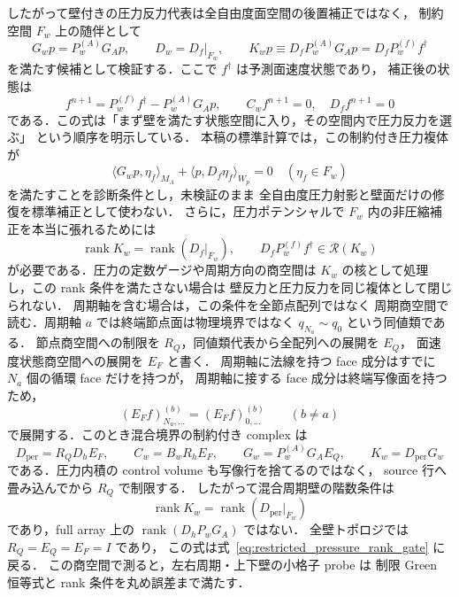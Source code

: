 したがって壁付きの圧力反力代表は全自由度面空間の後置補正ではなく，
制約空間 $F_w$ 上の随伴として
\begin{equation}
  G_w p = P_w^{(A)}G_Ap,\qquad
  D_w = D_f|_{F_w},\qquad
  K_wp\equiv D_fP_w^{(A)}G_Ap = D_fP_w^{(f)} f^\dagger
  \label{eq:restricted_pressure_operator}
\end{equation}
を満たす候補として検証する．ここで $f^\dagger$ は予測面速度状態であり，
補正後の状態は
\begin{equation}
  f^{n+1}
  =
  P_w^{(f)}f^\dagger
  -
  P_w^{(A)}G_Ap,\qquad
  C_wf^{n+1}=0,\quad D_ff^{n+1}=0
  \label{eq:restricted_wall_pressure_update}
\end{equation}
である．この式は「まず壁を満たす状態空間に入り，その空間内で圧力反力を選ぶ」
という順序を明示している．
本稿の標準計算では，この制約付き圧力複体が
\[
  \langle G_wp,\eta_f\rangle_{M_A}
  +
  \langle p,D_f\eta_f\rangle_{W_p}=0
  \quad(\eta_f\in F_w)
\]
を満たすことを診断条件とし，未検証のまま
全自由度圧力射影と壁面だけの修復を標準補正として使わない．
さらに，圧力ポテンシャルで $F_w$ 内の非圧縮補正を本当に張れるためには
\begin{equation}
  \operatorname{rank}K_w
  =
  \operatorname{rank}(D_f|_{F_w}),\qquad
  D_fP_w^{(f)}f^\dagger\in\mathcal{R}(K_w)
  \label{eq:restricted_pressure_rank_gate}
\end{equation}
が必要である．圧力の定数ゲージや周期方向の商空間は
$K_w$ の核として処理し，この rank 条件を満たさない場合は
壁反力と圧力反力を同じ複体として閉じられない．
周期軸を含む場合は，この条件を全節点配列ではなく
周期商空間で読む．周期軸 $a$ では終端節点面は物理境界ではなく
$q_{N_a}\sim q_0$ という同値類である．
節点商空間への制限を $R_Q$，同値類代表から全配列への展開を $E_Q$，
面速度状態商空間への展開を $E_F$ と書く．
周期軸に法線を持つ face 成分はすでに $N_a$ 個の循環 face だけを持つが，
周期軸に接する face 成分は終端写像面を持つため，
\[
  (E_F f)^{(b)}_{N_a,\ldots}=(E_F f)^{(b)}_{0,\ldots}
  \qquad (b\ne a)
\]
で展開する．このとき混合境界の制約付き complex は
\begin{equation}
  D_{\mathrm{per}} = R_QD_hE_F,\qquad
  C_w=B_wR_hE_F,\qquad
  G_w=P_w^{(A)}G_AE_Q,\qquad
  K_w=D_{\mathrm{per}}G_w
  \label{eq:periodic_wall_quotient_complex}
\end{equation}
である．圧力内積の control volume も写像行を捨てるのではなく，
source 行へ畳み込んでから $R_Q$ で制限する．
したがって混合周期壁の階数条件は
\begin{equation}
  \operatorname{rank}K_w
  =
  \operatorname{rank}(D_{\mathrm{per}}|_{F_w})
  \label{eq:periodic_wall_quotient_rank_gate}
\end{equation}
であり，full array 上の
$\operatorname{rank}(D_hP_wG_A)$ ではない．
全壁トポロジでは $R_Q=E_Q=E_F=I$ であり，
この式は式~\eqref{eq:restricted_pressure_rank_gate} に戻る．
この商空間で測ると，左右周期・上下壁の小格子 probe は
制限 Green 恒等式と rank 条件を丸め誤差まで満たす．

